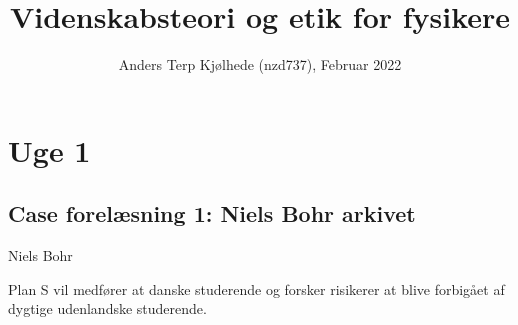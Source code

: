 \documentclass[a4paper,12pkt]{article}
\title{Videnskabsteori og etik for fysikere}
\author{Anders Terp Kjølhede (nzd737), Februar 2022}
\begin{document}
\pagestyle{fancy}
\fancyhf{}

\maketitle

\onehalfspacing %
\setlength{\jot}{10pt} %

\tableofcontents

\section{Uge 1}

\subsection{Case forelæsning 1: Niels Bohr arkivet}

Niels Bohr 

\vspace{0.5cm}

Plan S vil medfører at danske studerende og forsker risikerer at blive forbigået af dygtige udenlandske studerende.

\vspace{0.5cm}
\end{document}
